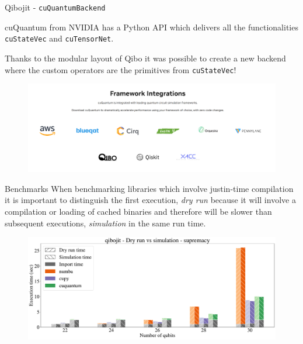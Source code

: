 \documentclass[11p,aspectratio=169]{beamer}
\begin{document}

    


\begin{frame}{Qibojit - \texttt{cuQuantumBackend}}

    cuQuantum from NVIDIA has a Python API which delivers all the functionalities 
    \texttt{cuStateVec} and \texttt{cuTensorNet}.

    Thanks to the modular layout of Qibo it was possible to create a new backend
    where the custom operators are the primitives from \texttt{cuStateVec}!

   \begin{figure}
        \includegraphics[width = \textwidth]{figures/nvidia.png}
   \end{figure}

\end{frame} 

\begin{frame}{Benchmarks}
    When benchmarking libraries which involve justin-time compilation it is important to distinguish the
first execution, \emph{dry run} because it will involve a compilation
or loading of cached binaries and therefore will be
slower than subsequent executions, \emph{simulation} in the same run
time.
    \begin{figure}
        \includegraphics[width=\textwidth]{figures/qibojit_dry_vs_simulation_supremacy_double.pdf}
    \end{figure}
\end{frame}
\end{document}
